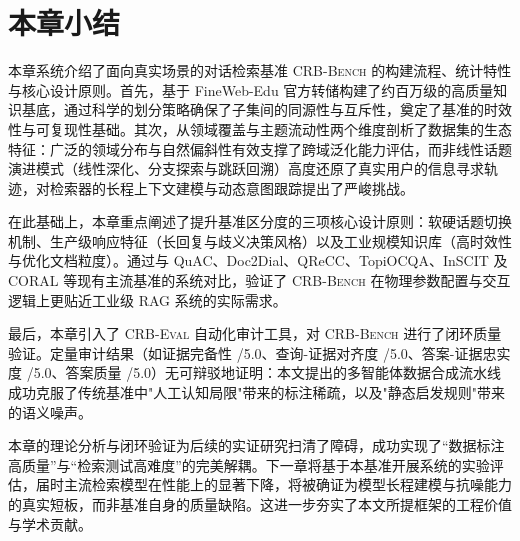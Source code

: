 

\section{本章小结}
\label{sec:chapter6_summary}

本章系统介绍了面向真实场景的对话检索基准 \textsc{CRB-Bench} 的构建流程、统计特性与核心设计原则。首先，基于 FineWeb-Edu 官方转储构建了约百万级的高质量知识基底，通过科学的划分策略确保了子集间的同源性与互斥性，奠定了基准的时效性与可复现性基础。其次，从领域覆盖与主题流动性两个维度剖析了数据集的生态特征：广泛的领域分布与自然偏斜性有效支撑了跨域泛化能力评估，而非线性话题演进模式（线性深化、分支探索与跳跃回溯）高度还原了真实用户的信息寻求轨迹，对检索器的长程上下文建模与动态意图跟踪提出了严峻挑战。

在此基础上，本章重点阐述了提升基准区分度的三项核心设计原则：软硬话题切换机制、生产级响应特征（长回复与歧义决策风格）以及工业规模知识库（高时效性与优化文档粒度）。通过与 QuAC、Doc2Dial、QReCC、TopiOCQA、InSCIT 及 CORAL 等现有主流基准的系统对比，验证了 \textsc{CRB-Bench} 在物理参数配置与交互逻辑上更贴近工业级 RAG 系统的实际需求。

最后，本章引入了 \textsc{CRB-Eval} 自动化审计工具，对 \textsc{CRB-Bench} 进行了闭环质量验证。定量审计结果（如证据完备性 \TBD{}/5.0、查询-证据对齐度 \TBD{}/5.0、答案-证据忠实度 \TBD{}/5.0、答案质量 \TBD{}/5.0）无可辩驳地证明：本文提出的多智能体数据合成流水线成功克服了传统基准中"人工认知局限"带来的标注稀疏，以及"静态启发规则"带来的语义噪声。

本章的理论分析与闭环验证为后续的实证研究扫清了障碍，成功实现了“数据标注高质量”与“检索测试高难度”的完美解耦。下一章将基于本基准开展系统的实验评估，届时主流检索模型在性能上的显著下降，将被确证为模型长程建模与抗噪能力的真实短板，而非基准自身的质量缺陷。这进一步夯实了本文所提框架的工程价值与学术贡献。
